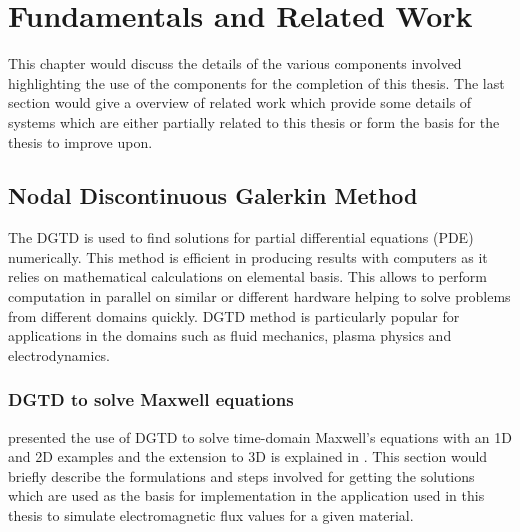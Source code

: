 \chapter{Fundamentals and Related Work}
\label{cha:Fundamentals}

This chapter would discuss the details of the various components involved highlighting
the use of the components for the completion of this thesis. The last section
would give a overview of related work which provide some details of systems which
are either partially related to this thesis or form the basis for the thesis to improve
upon. 

\section{Nodal Discontinuous Galerkin Method}

The \ac{DGTD} \cite{hesthaven_nodal_2008} is used to find solutions
for partial differential equations (PDE) numerically. This method is efficient in
producing results with computers as it relies on mathematical calculations on elemental basis.
This allows to perform computation in parallel on similar or different hardware helping to
solve problems from different domains quickly. \ac{DGTD} method is particularly popular for applications
in the domains such as fluid mechanics, plasma physics and electrodynamics.

\subsection{DGTD to solve Maxwell equations}
\label{sec:dgtd_maxwell}

\textcite{Hesthaven_190449} presented the use of \ac{DGTD} to solve time-domain Maxwell's equations with
an 1D and 2D examples and the extension to 3D is explained in \cite{hesthaven_nodal_2008}. This section
would briefly describe the formulations and steps involved for getting the solutions which are
used as the basis for implementation in the application used in this thesis to simulate
electromagnetic flux values for a given material.

